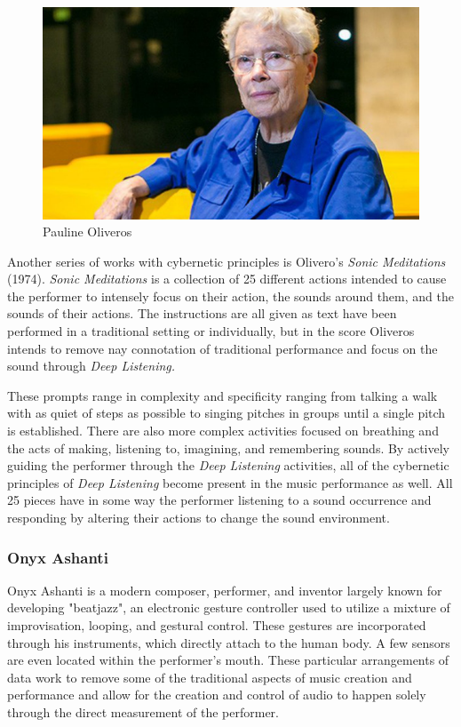 \begin{figure}
    \centering %
    \includegraphics[scale=0.25]{diagrams/oliveros.jpg}
    \caption{Pauline Oliveros}
    \label{fig:oliverosHS}
\end{figure}

Another series of works with cybernetic principles is Olivero's \textit{Sonic Meditations} (1974). \textit{Sonic Meditations} is a collection of 25 different actions intended to cause the performer to intensely focus on their action, the sounds around them, and the sounds of their actions\cite{OliverosMeditations}. The instructions are all given as text have been performed in a traditional setting or individually, but in the score Oliveros intends to remove nay connotation of traditional performance and focus on the sound through \textit{Deep Listening.} 

These prompts range in complexity and specificity ranging from talking a walk with as quiet of steps as possible to singing pitches in groups until a single pitch is established. There are also more complex activities focused on breathing and the acts of making, listening to, imagining, and remembering sounds\cite{OliverosMeditations}. By actively guiding the performer through the \textit{Deep Listening} activities, all of the cybernetic principles of \textit{Deep Listening} become present in the music performance as well. All 25 pieces have in some way the performer listening to a sound occurrence and responding by altering their actions to change the sound environment.

\subsubsection{Onyx Ashanti} 
Onyx Ashanti is a modern composer, performer, and inventor largely known for developing "beatjazz", an electronic gesture controller used to utilize a mixture of improvisation, looping, and gestural control. These gestures are incorporated through his instruments, which directly attach to the human body. A few sensors are even located within the performer's mouth. These particular arrangements of data work to remove some of the traditional aspects of music creation and performance and allow for the creation and control of audio to happen solely through the direct measurement of the performer.

